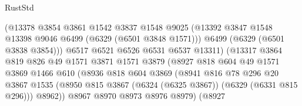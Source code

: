 \begin{lexlean}{RustStd}
\begin{coremodule}
{{                                (@13378
                                  @3854
                                  @3861
                                  @1542
                                  @3837
                                  @1548
                                  @9025
                                  (@13392
                                    @3847
                                    @1548
                                    @13398
                                    @9046
                                    @6499
                                    (@6329 (@6501 @3848 @1571)))
                                  @6499
                                  (@6329 (@6501 @3838 @3854)))
                                @6517
                                @6521
                                @6526
                                @6531
                                @6537
                                @13311)
                              (@13317
                                @3864
                                @819
                                @826
                                @49
                                @1571
                                @3871
                                @1571
                                @3879
                                (@8927
                                  @818
                                  @604
                                  @49
                                  @1571
                                  @3869
                                  @1466
                                  @610
                                  (@8936
                                    @818
                                    @604
                                    @3869
                                    (@8941
                                      @816
                                      @78
                                      @296
                                      @20
                                      @3867
                                      @1535
                                      (@8950
                                        @815
                                        @3867
                                        (@6324 (@6325 @3867))
                                        (@6329 (@6331 @815 @296)))
                                      @8962))
                                  @8967
                                  @8970
                                  @8973
                                  @8976
                                  @8979)
                                (@8927
}}
\end{coremodule}
\end{lexlean}
